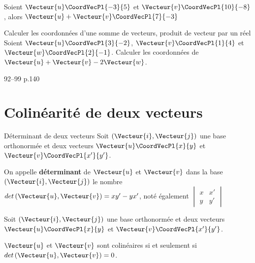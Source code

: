 \documentclass[a4paper]{article}
\begin{document}
\begin{example}{}{}
  Soient $\Vecteur{u}\CoordVecPl{-3}{5}$  et $\Vecteur{v}\CoordVecPl{10}{-8}$, alors $\Vecteur{u}+\Vecteur{v}\CoordVecPl{7}{-3}$
\end{example}


\begin{methode*}{Calculer les coordonnées d'une somme de vecteurs, produit de vecteur par un réel}{}
  Soient $\Vecteur{u}\CoordVecPl{3}{-2}$, $\Vecteur{v}\CoordVecPl{1}{4}$ et $\Vecteur{w}\CoordVecPl{2}{-1}$.
  Calculer les coordonnées de $\Vecteur{u}+\Vecteur{v}-2\Vecteur{w}$.
 
   \vspace{2cm}
 
   \hfill{}
 \end{methode*}

 \begin{exercices}{}{}
  92--99 p.140
  \end{exercices}


 \pagebreak

 \section{Colinéarité de deux vecteurs}
\begin{definition}{Déterminant de deux vecteurs}{}
Soit $\left(\Vecteur{i},\Vecteur{j}\right)$ une base orthonormée et deux vecteurs $\Vecteur{u}\CoordVecPl{x}{y}$ et $\Vecteur{v}\CoordVecPl{x'}{y'}$.

On appelle \textbf{déterminant} de $\Vecteur{u}$ et $\Vecteur{v}$ dans la base $\left(\Vecteur{i},\Vecteur{j}\right)$ le nombre $det\left(\Vecteur{u},\Vecteur{v}\right)=xy'-yx'$, noté également 
$\begin{vmatrix} 
  x & x' \\ 
  y & y' 
  \end{vmatrix} $
\end{definition}

\begin{propriete}{}{}
  Soit $\left(\Vecteur{i},\Vecteur{j}\right)$ une base orthonormée et deux vecteurs $\Vecteur{u}\CoordVecPl{x}{y}$ et $\Vecteur{v}\CoordVecPl{x'}{y'}$.

  $\Vecteur{u}$ et $\Vecteur{v}$ sont colinéaires si et seulement si $det\left(\Vecteur{u},\Vecteur{v}\right)=0$.
\end{propriete}
\end{document}
